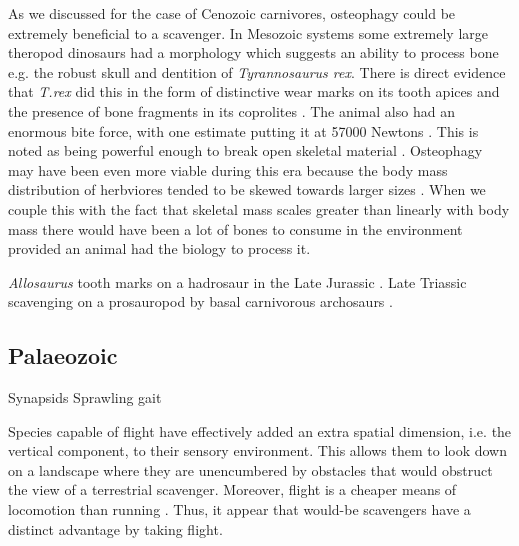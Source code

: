 \documentclass[a4paper,12pt]{article}
\begin{document}
As we discussed for the case of Cenozoic carnivores, osteophagy could be extremely beneficial to a scavenger. 
In Mesozoic systems some extremely large theropod dinosaurs had a morphology which suggests an ability to process bone e.g. the robust skull and dentition of \textit{Tyrannosaurus rex}. 
There is direct evidence that \textit{T.rex} did this in the form of distinctive wear marks on its tooth apices \citep{farlow1994wear,schubert2005wear} and the presence of bone fragments in its coprolites \citep{chin1998king}. 
The animal also had an enormous bite force, with one estimate putting it at 57000 Newtons \citep{bates2012estimating}. 
This is noted as being powerful enough to break open skeletal material \citep{rayfield2001cranial}. 
Osteophagy may have been even more viable during this era because the body mass distribution of herbviores tended to be skewed towards larger sizes \citep{10.1371/journal.pone.0051925}. 
When we couple this with the fact that skeletal mass scales greater than linearly with body mass \citep{prange1979scaling} there would have been a lot of bones to consume in the environment provided an animal had the biology to process it. 


\textit{Allosaurus} tooth marks on a hadrosaur in the Late Jurassic \citep{chure1997one}. 
Late Triassic scavenging on a prosauropod by basal carnivorous archosaurs \citep{hungerbuhler1998taphonomy}.

\subsection*{Palaeozoic}
Synapsids 
Sprawling gait



Species capable of flight have effectively added an extra spatial dimension, i.e. the vertical component, to their sensory environment.
This allows them to look down on a landscape where they are unencumbered by obstacles that would obstruct the view of a terrestrial scavenger.
Moreover, flight is a cheaper means of locomotion than running \citep{tucker1975energetic}. 
Thus, it appear that would-be scavengers have a distinct advantage by taking flight. 
\end{document}

